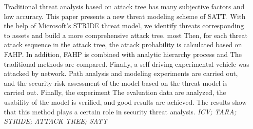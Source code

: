   Traditional threat analysis based on attack tree has many subjective factors and low accuracy. This paper presents a new threat modeling scheme of SATT.
  With the help of Microsoft's STRIDE threat model, we identify threats corresponding to assets and build a more comprehensive attack tree. most
  Then, for each threat attack sequence in the attack tree, the attack probability is calculated based on FAHP. In addition, FAHP is combined with analytic hierarchy process and
  The traditional methods are compared. Finally, a self-driving experimental vehicle was attacked by network.
  Path analysis and modeling experiments are carried out, and the security risk assessment of the model based on the threat model is carried out. Finally, the experiment
  The evaluation data are analyzed, the usability of the model is verified, and good results are achieved.
  The results show that this method plays a certain role in security threat analysis.
  \newline
{}\textit{ICV; TARA; STRIDE; ATTACK TREE; SATT}
